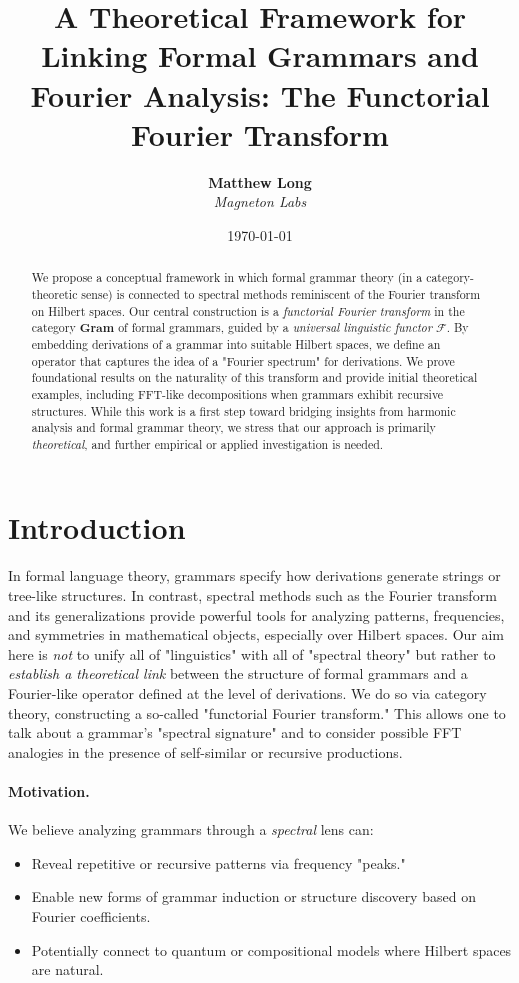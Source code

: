 \documentclass[11pt]{article}
\title{\textbf{A Theoretical Framework for Linking Formal Grammars and Fourier Analysis: The Functorial Fourier Transform}}
\author{
  \textbf{Matthew Long}\\
  \textit{Magneton Labs}
}
\date{\today}
\begin{document}
\maketitle

\begin{abstract}
We propose a conceptual framework in which formal grammar theory (in a category-theoretic sense) is connected to spectral methods reminiscent of the Fourier transform on Hilbert spaces. Our central construction is a \emph{functorial Fourier transform} in the category \(\mathbf{Gram}\) of formal grammars, guided by a \emph{universal linguistic functor} \(\mathcal{F}\). By embedding derivations of a grammar into suitable Hilbert spaces, we define an operator that captures the idea of a "Fourier spectrum" for derivations. We prove foundational results on the naturality of this transform and provide initial theoretical examples, including FFT-like decompositions when grammars exhibit recursive structures. While this work is a first step toward bridging insights from harmonic analysis and formal grammar theory, we stress that our approach is primarily \emph{theoretical}, and further empirical or applied investigation is needed.
\end{abstract}

\tableofcontents

\section{Introduction}

In formal language theory, grammars specify how derivations generate strings or tree-like structures. In contrast, spectral methods such as the Fourier transform and its generalizations provide powerful tools for analyzing patterns, frequencies, and symmetries in mathematical objects, especially over Hilbert spaces. Our aim here is \emph{not} to unify all of "linguistics" with all of "spectral theory" but rather to \emph{establish a theoretical link} between the structure of formal grammars and a Fourier-like operator defined at the level of derivations. We do so via category theory, constructing a so-called "functorial Fourier transform." This allows one to talk about a grammar's "spectral signature" and to consider possible FFT analogies in the presence of self-similar or recursive productions.

\paragraph{Motivation.} We believe analyzing grammars through a \emph{spectral} lens can:
\begin{itemize}
    \item Reveal repetitive or recursive patterns via frequency "peaks."
    \item Enable new forms of grammar induction or structure discovery based on Fourier coefficients.
    \item Potentially connect to quantum or compositional models where Hilbert spaces are natural.
\end{itemize}
\end{document}

